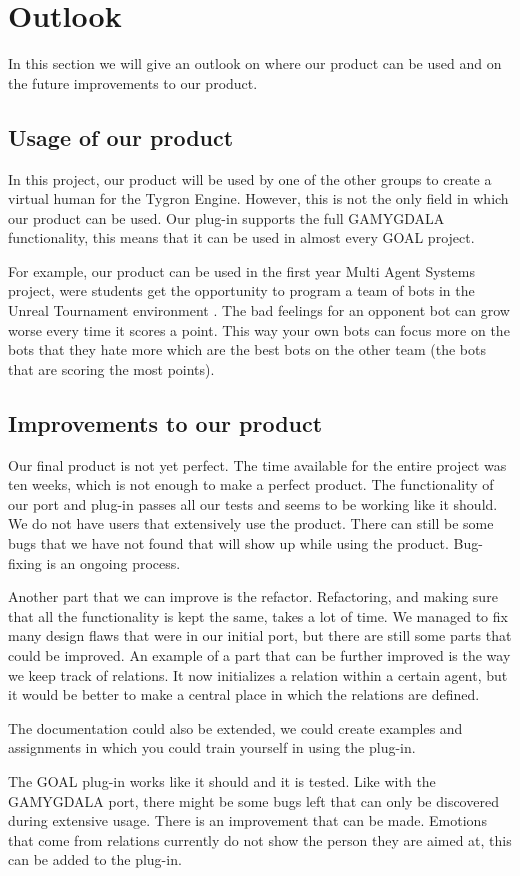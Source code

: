 \section{Outlook}
In this section we will give an outlook on where our product can be used and on the future improvements to our product.

\subsection{Usage of our product}
In this project, our product will be used by one of the other groups to create a virtual human for the Tygron Engine. However, this is not the only field in which our product can be used. Our plug-in supports the full GAMYGDALA functionality, this means that it can be used in almost every GOAL project. \par
For example, our product can be used in the first year Multi Agent Systems project, were students get the opportunity to program a team of bots in the Unreal Tournament environment \citep{UT}. The bad feelings for an opponent bot can grow worse every time it scores a point. This way your own bots can focus more on the bots that they hate more which are the best bots on the other team (the bots that are scoring the most points).

\subsection{Improvements to our product}
Our final product is not yet perfect. The time available for the entire project was ten weeks, which is not enough to make a perfect product. The functionality of our port and plug-in passes all our tests and seems to be working like it should. We do not have users that extensively use the product. There can still be some bugs that we have not found that will show up while using the product. Bug-fixing is an ongoing process. \par
Another part that we can improve is the refactor. Refactoring, and making sure that all the functionality is kept the same, takes a lot of time. We managed to fix many design flaws that were in our initial port, but there are still some parts that could be improved. An example of a part that can be further improved is the way we keep track of relations. It now initializes a relation within a certain agent, but it would be better to make a central place in which the relations are defined. \par
The documentation could also be extended, we could create examples and assignments in which you could train yourself in using the plug-in. \par
The GOAL plug-in works like it should and it is tested. Like with the GAMYGDALA port, there might be some bugs left that can only be discovered during extensive usage. There is an improvement that can be made. Emotions that come from relations currently do not show the person they are aimed at, this can be added to the plug-in.